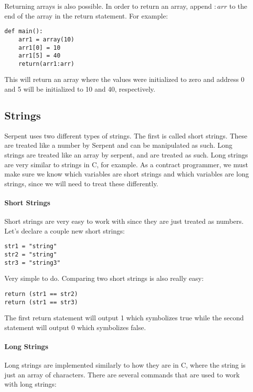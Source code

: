 \documentclass[12pt]{article}
\begin{document}
Returning arrays is also possible.\cite{Serpent} In order to return an array, append $:arr$ to the end of the array in the return statement. For example:

\begin{lstlisting}
def main():
	arr1 = array(10)
	arr1[0] = 10
	arr1[5] = 40
	return(arr1:arr)
\end{lstlisting}

This will return an array where the values were initialized to zero and address 0 and 5 will be initialized to 10 and 40, respectively. \cite{Serpent}

\subsection{Strings}
	Serpent uses two different types of strings. The first is called short strings. These are treated like a number by Serpent and can be manipulated as such. Long strings are treated like an array by serpent, and are treated as such. Long strings are very similar to strings in C, for example. As a contract programmer, we must make sure we know which variables are short strings and which variables are long strings, since we will need to treat these differently. \cite{Serpent}

\paragraph{Short Strings}
	Short strings are very easy to work with since they are just treated as numbers. Let's declare a couple new short strings:
	
\begin{lstlisting}
str1 = "string"
str2 = "string"
str3 = "string3"
\end{lstlisting}

Very simple to do. Comparing two short strings is also really easy:

\begin{lstlisting}
return (str1 == str2)
return (str1 == str3)
\end{lstlisting}

The first return statement will output 1 which symbolizes true while the second statement will output 0 which symbolizes false. \cite{Serpent}

\paragraph{Long Strings}
Long strings are implemented similarly to how they are in C, where the string is just an array of characters. There are several commands that are used to work with long strings:
\end{document}

